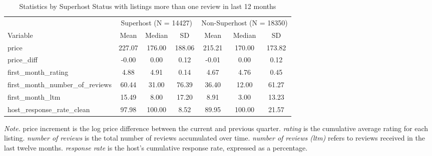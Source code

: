 \begin{table}[]
\centering 
\caption{Statistics by Superhost Status with listings more than one review in last 12 months\label{tab:desc_stats}} 
\vspace{0.5em} 
\begin{tabular}{lccc|ccc} 
\hline 
 & \multicolumn{3}{c|}{Superhost (N = 14427)} & \multicolumn{3}{c}{Non-Superhost (N = 18350)} \\
Variable & Mean & Median & SD & Mean & Median & SD \\
\hline
price & 227.07 & 176.00 & 188.06 & 215.21 & 170.00 & 173.82 \\
price\_diff & -0.00 & 0.00 & 0.12 & -0.01 & 0.00 & 0.12 \\
first\_month\_rating & 4.88 & 4.91 & 0.14 & 4.67 & 4.76 & 0.45 \\
first\_month\_number\_of\_reviews & 60.44 & 31.00 & 76.39 & 36.40 & 12.00 & 61.27 \\
first\_month\_ltm & 15.49 & 8.00 & 17.20 & 8.91 & 3.00 & 13.23 \\
host\_response\_rate\_clean & 97.98 & 100.00 & 8.52 & 89.95 & 100.00 & 21.57 \\
\hline
\end{tabular} 
\vspace{0.5em} 
\parbox{0.95\textwidth}{\footnotesize \textit{Note.} price increment is the log price difference between the current and previous quarter. 
\textit{rating} is the cumulative average rating for each listing. 
\textit{number of reviews} is the total number of reviews accumulated over time. 
\textit{number of reviews (ltm)} refers to reviews received in the last twelve months. 
\textit{response rate} is the host's cumulative response rate, expressed as a percentage.
} 
\end{table} 
 
